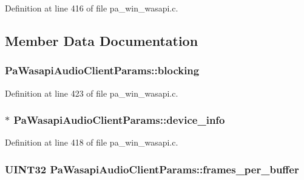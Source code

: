 Definition at line 416 of file pa\+\_\+win\+\_\+wasapi.\+c.



\subsection{Member Data Documentation}
\subsubsection[{\texorpdfstring{blocking}{blocking}}]{ Pa\+Wasapi\+Audio\+Client\+Params\+::blocking}\hypertarget{struct_pa_wasapi_audio_client_params_a1e3a0ed3228bb5fb0ff14f3207c8f2c4}{}\label{struct_pa_wasapi_audio_client_params_a1e3a0ed3228bb5fb0ff14f3207c8f2c4}


Definition at line 423 of file pa\+\_\+win\+\_\+wasapi.\+c.

\subsubsection[{\texorpdfstring{device\+\_\+info}{device_info}}]{$\ast$ Pa\+Wasapi\+Audio\+Client\+Params\+::device\+\_\+info}\hypertarget{struct_pa_wasapi_audio_client_params_a733d080b96ac95e47f1e673447c041f2}{}\label{struct_pa_wasapi_audio_client_params_a733d080b96ac95e47f1e673447c041f2}


Definition at line 418 of file pa\+\_\+win\+\_\+wasapi.\+c.

\subsubsection[{\texorpdfstring{frames\+\_\+per\+\_\+buffer}{frames_per_buffer}}]{\setlength{\rightskip}{0pt plus 5cm}U\+I\+N\+T32 Pa\+Wasapi\+Audio\+Client\+Params\+::frames\+\_\+per\+\_\+buffer}\hypertarget{struct_pa_wasapi_audio_client_params_aa46fc2eb761fffa9ee34baf829b70e0e}{}\label{struct_pa_wasapi_audio_client_params_aa46fc2eb761fffa9ee34baf829b70e0e}


